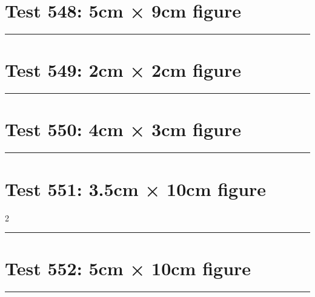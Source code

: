 \documentclass[a4paper,11pt]{article}
\begin{document}
\section*{Test 548: 5cm × 9cm figure}
\begin{swarmwrap}%
  \begin{minipage}[t]{5cm}
    \centering
    \rule{\linewidth}{9cm}
  \end{minipage}%
\end{swarmwrap}%
\swarmwrapnext
\lipsum[76]
\lipsum[77]
\lipsum[78]
\lipsum[79]
\section*{Test 549: 2cm × 2cm figure}
\begin{swarmwrap}%
  \begin{minipage}[t]{2cm}
    \centering
    \rule{\linewidth}{2cm}
  \end{minipage}%
\end{swarmwrap}%
\swarmwrapnext
\lipsum[147]
\lipsum[148]
\lipsum[149]
\lipsum[150]
\lipsum[1]
\section*{Test 550: 4cm × 3cm figure}
\begin{swarmwrap}%
  \begin{minipage}[t]{4cm}
    \centering
    \rule{\linewidth}{3cm}
  \end{minipage}%
\end{swarmwrap}%
\swarmwrapnext
\lipsum[74]
\lipsum[75]
\lipsum[76]
\lipsum[77]
\lipsum[78]
\section*{Test 551: 3.5cm × 10cm figure}
\begin{multicols}{2}
  \begin{swarmwrap}%
    \begin{minipage}[t]{3cm}
      \centering
      \rule{\linewidth}{10cm}
    \end{minipage}%
  \end{swarmwrap}%
  \swarmwrapnext
  \lipsum[36]
  \lipsum[37]
  \lipsum[38]
  \lipsum[39]
  \lipsum[40]
  \lipsum[41]
\end{multicols}
\section*{Test 552: 5cm × 10cm figure}
\begin{swarmwrap}%
  \begin{minipage}[t]{5cm}
    \centering
    \rule{\linewidth}{10cm}
  \end{minipage}%
\end{swarmwrap}%
\swarmwrapnext
\lipsum[71]
\lipsum[72]
\lipsum[73]
\lipsum[74]
\lipsum[75]
\lipsum[76]
\end{document}

